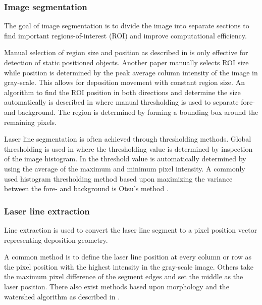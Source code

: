 \documentclass[10pt,letter]{article}
\begin{document}
\subsubsection{Image segmentation}
The goal of image segmentation is to divide the image into separate sections to find important regions-of-interest (ROI) and improve computational efficiency. 

Manual selection of region size and position as described in \cite{huang2012development} is only effective for detection of static positioned objects. Another paper \cite{wang2014weld} manually selects ROI size while position is determined by the peak average column intensity of the image in gray-scale. This allows for deposition movement with constant region size. An algorithm to find the ROI position in both directions and determine the size automatically is described in \cite{xu2004features} where manual thresholding is used to separate fore- and background. The region is determined by forming a bounding box around the remaining pixels. 

Laser line segmentation is often achieved through thresholding methods. Global thresholding is used in \cite{zhang2007vision} where the thresholding value is determined by inspection of the image histogram. In \cite{wang2014weld} the threshold value is automatically determined by using the average of the maximum and minimum pixel intensity. A commonly used histogram thresholding method based upon maximizing the variance between the fore- and background is Otsu's method \cite{otsu1979threshold}. 

\subsubsection{Laser line extraction}
Line extraction is used to convert the laser line segment to a pixel position vector representing deposition geometry. 

A common method \cite{huang2012development} \cite{nguyen2014laser} \cite{kim1995robust} \cite{li2010measurement} is to define the laser line position at every column or row as the pixel position with the highest intensity in the gray-scale image. Others \cite{davis2011vision} \cite{xu2004features} \cite{zhang2007vision} take the maximum pixel difference of the segment edges and set the middle as the laser position. There also exist methods based upon morphology and the watershed algorithm as described in \cite{li2007recent}.
\end{document}
